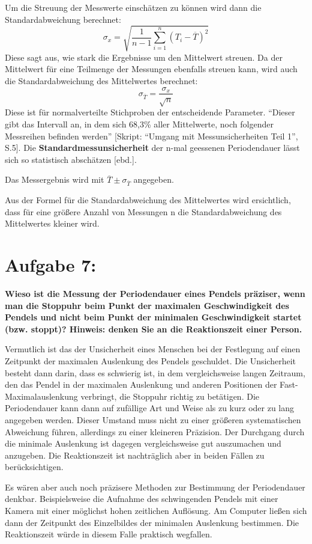 \documentclass[
]{article}
\begin{document}
Um die Streuung der Messwerte einschätzen zu können wird dann die
Standardabweichung berechnet:
\[\sigma_x = \sqrt{\frac{1}{n-1} \sum_{i=1}^n (T_i - \overline{T})^2}\]
Diese sagt aus, wie stark die Ergebnisse um den Mittelwert streuen. Da
der Mittelwert für eine Teilmenge der Messungen ebenfalls streuen kann,
wird auch die Standardabweichung des Mittelwertes berechnet:
\[\sigma_{\overline{T}}=\frac{\sigma_x}{\sqrt{n}}\] Diese ist für
normalverteilte Stichproben der entscheidende Parameter. ``Dieser gibt
das Intervall an, in dem sich 68,3\% aller Mittelwerte, noch folgender
Messreihen befinden werden'' {[}Skript: ``Umgang mit Messunsicherheiten
Teil 1'', S.5{]}. Die \textbf{Standardmessunsicherheit} der n-mal
geessenen Periodendauer lässt sich so statistisch abschätzen {[}ebd.{]}.

Das Messergebnis wird mit \(\overline{T} \pm \sigma_{\overline{T}}\)
angegeben.

Aus der Formel für die Standardabweichung des Mittelwertes wird
ersichtlich, dass für eine größere Anzahl von Messungen n die
Standardabweichung des Mittelwertes kleiner wird.

\hypertarget{aufgabe-7}{%
\section{Aufgabe 7:}\label{aufgabe-7}}

\textbf{Wieso ist die Messung der Periodendauer eines Pendels präziser,
wenn man die Stoppuhr beim Punkt der maximalen Geschwindigkeit des
Pendels und nicht beim Punkt der minimalen Geschwindigkeit startet (bzw.
stoppt)? Hinweis: denken Sie an die Reaktionszeit einer Person.}

Vermutlich ist das der Unsicherheit eines Menschen bei der Festlegung
auf einen Zeitpunkt der maximalen Auslenkung des Pendels geschuldet. Die
Unsicherheit besteht dann darin, dass es schwierig ist, in dem
vergleichsweise langen Zeitraum, den das Pendel in der maximalen
Auslenkung und anderen Positionen der Fast-Maximalauslenkung verbringt,
die Stoppuhr richtig zu betätigen. Die Periodendauer kann dann auf
zufällige Art und Weise als zu kurz oder zu lang angegeben werden.
Dieser Umstand muss nicht zu einer größeren systematischen Abweichung
führen, allerdings zu einer kleineren Präzision. Der Durchgang durch die
minimale Auslenkung ist dagegen vergleichsweise gut auszumachen und
anzugeben. Die Reaktionszeit ist nachträglich aber in beiden Fällen zu
berücksichtigen.

Es wären aber auch noch präzisere Methoden zur Bestimmung der
Periodendauer denkbar. Beispielsweise die Aufnahme des schwingenden
Pendels mit einer Kamera mit einer möglichst hohen zeitlichen Auflösung.
Am Computer ließen sich dann der Zeitpunkt des Einzelbildes der
minimalen Auslenkung bestimmen. Die Reaktionszeit würde in diesem Falle
praktisch wegfallen.
\end{document}
